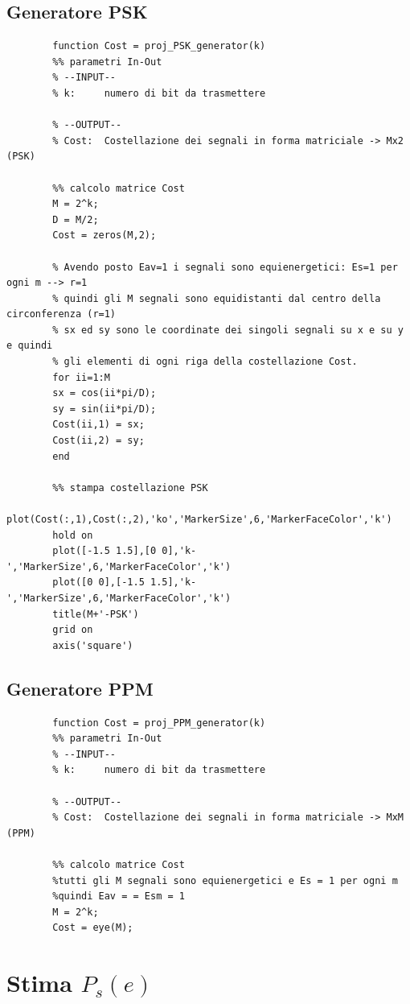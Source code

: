 \documentclass[12pt, a4paper]{article}
\begin{document}
	\subsection{Generatore PSK}
	\begin{lstlisting}
		function Cost = proj_PSK_generator(k)
		%% parametri In-Out
		% --INPUT--
		% k:     numero di bit da trasmettere
		
		% --OUTPUT--
		% Cost:  Costellazione dei segnali in forma matriciale -> Mx2 (PSK)
		
		%% calcolo matrice Cost
		M = 2^k;
		D = M/2;
		Cost = zeros(M,2);
		
		% Avendo posto Eav=1 i segnali sono equienergetici: Es=1 per ogni m --> r=1
		% quindi gli M segnali sono equidistanti dal centro della circonferenza (r=1)
		% sx ed sy sono le coordinate dei singoli segnali su x e su y e quindi 
		% gli elementi di ogni riga della costellazione Cost.
		for ii=1:M
		sx = cos(ii*pi/D);
		sy = sin(ii*pi/D);
		Cost(ii,1) = sx;
		Cost(ii,2) = sy;
		end
		
		%% stampa costellazione PSK
		plot(Cost(:,1),Cost(:,2),'ko','MarkerSize',6,'MarkerFaceColor','k')
		hold on
		plot([-1.5 1.5],[0 0],'k-','MarkerSize',6,'MarkerFaceColor','k')
		plot([0 0],[-1.5 1.5],'k-','MarkerSize',6,'MarkerFaceColor','k')
		title(M+'-PSK')
		grid on
		axis('square')
	\end{lstlisting}
	\subsection{Generatore PPM}
	\begin{lstlisting}
		function Cost = proj_PPM_generator(k)
		%% parametri In-Out
		% --INPUT--
		% k:     numero di bit da trasmettere
		
		% --OUTPUT--
		% Cost:  Costellazione dei segnali in forma matriciale -> MxM (PPM)
		
		%% calcolo matrice Cost
		%tutti gli M segnali sono equienergetici e Es = 1 per ogni m
		%quindi Eav = = Esm = 1
		M = 2^k;
		Cost = eye(M); 
	\end{lstlisting}
	\newpage
	
	\section{Stima \(P_s(e)\)}
\end{document}

